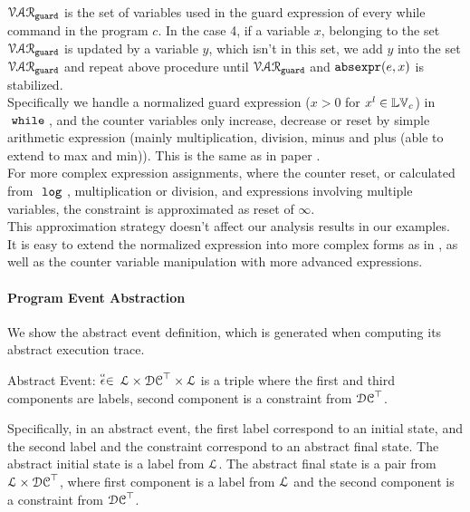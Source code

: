     $\mathcal{VAR}_{\mathtt{guard}}$ is the set of variables used in the guard expression of every while command in the program $c$. 
  In the case 4, if a variable $x$, belonging to the set 
  $\mathcal{VAR}_{\mathtt{guard}}$ is updated by a variable $y$, which isn't in this set, 
  we add $y$ into the set $\mathcal{VAR}_{\mathtt{guard}}$ and repeat 
  above procedure  until $\mathcal{VAR}_{\mathtt{guard}}$ and $\mathtt{abs}{\mathtt{expr}}(e, x)$ is stabilized. 
  \\
Specifically 
we handle a 
normalized guard expression ($ x > 0$ for $x^l \in \mathbb{LV}_c$)
 in $\;\mathtt{while}\;$, and 
the counter variables only increase, decrease or reset by 
simple arithmetic expression (mainly multiplication, division, minus and plus (able to extend to max and min)). 
This is the same as in paper \cite{sinn2017complexity}. 
\\
For more complex expression assignments, where the counter reset, or calculated from $~\mathtt{log}~$, 
multiplication or division, and expressions involving multiple variables, the constraint is approximated as reset of $\infty$.
\\
This approximation strategy
doesn't affect our analysis results in our examples. It is easy to extend the normalized expression 
into more complex forms as in \cite{sinn2017complexity}, as well as the 
counter variable manipulation with more advanced expressions.


\paragraph{Program Event Abstraction}
We show the abstract event definition, which is generated when computing its abstract execution trace.

\begin{defn}
  \label{def:abs_event}
  Abstract Event: 
  $\stackrel{\scriptscriptstyle{\alpha}}{\mathtt{\epsilon}{}} \in $
  $\mathcal{L} \times \mathcal{DC}^{\top} \times \mathcal{L}$
  is a 
  triple where the first and third components are labels,
  second component is a constraint from $\mathcal{DC}^{\top}$.
  \end{defn}
  Specifically, in an abstract event, 
  the first label correspond to an initial state, and 
  the second label and the constraint correspond to an abstract final state.
 The abstract initial state is a label from $\mathcal{L}$.
The abstract final state is a pair from $\mathcal{L} \times \mathcal{DC}^{\top}$,  
where first component is a label from $\mathcal{L}$ and the second component is a constraint from $\mathcal{DC}^{\top}$.
%


